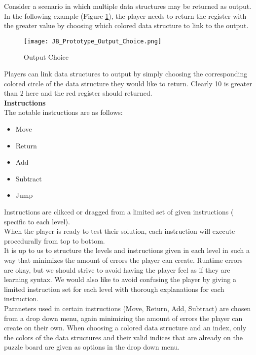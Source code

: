 Consider a scenario in which multiple data structures may be returned as output.
In the following example (Figure \ref{fig:Output_Choice}), the player needs to return the register
with the greater value by choosing which colored data structure to link to the output.

\begin{figure}[!hb]
  \caption{Output Choice}
  \label{fig:Output_Choice}
  \centering
  \texttt{[image: JB\_Prototype\_Output\_Choice.png]}
\end{figure}

Players can link data structures to output by simply choosing the corresponding colored
circle of the data structure they would like to return. Clearly 10 is greater than 2 here and
the red register should returned.\\

\textbf{Instructions}\\

The notable instructions are as follows:

\begin{itemize}
  \item Move
  \item Return
  \item Add
  \item Subtract
  \item Jump
\end{itemize}

Instructions are clikced or dragged from a limited set of given instructions (
specific to each level).\\

When the player is ready to test their solution, each instruction will execute
procedurally from top to bottom.\\

It is up to us to structure the levels and instructions given in each level in such
a way that minimizes the amount of errors the player can create. Runtime errors
are okay, but we should strive to avoid having the player feel as if they are learning
syntax. We would also like to avoid confusing the player by giving a limited
instruction set for each level with thorough explanations for each instruction.\\

Paraneters used in certain instructions (Move, Return, Add, Subtract) are chosen
from a drop down menu, again minimizing the amount of errors the player can create
on their own. When choosing a colored data structure and an index, only the colors of
the data structures and their valid indices that are already on the puzzle board
are given as options in the drop down menu.\\
\newpage

